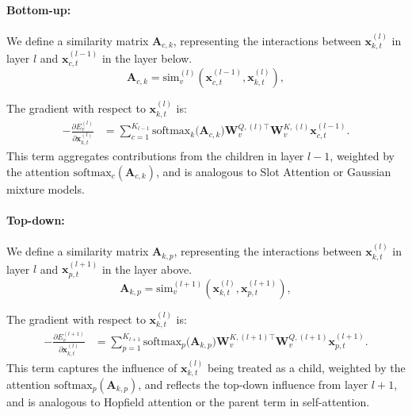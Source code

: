 \documentclass{article}
\begin{document}
\paragraph{Bottom-up:}

We define a similarity matrix \(\bm{A}_{c,k}\), representing the interactions between \(\bm{x}_{k,t}^{(l)}\) in layer \(l\) and \(\bm{x}_{c,t}^{(l-1)}\) in the layer below.
\begin{equation}
\bm{A}_{c,k} = \mathrm{sim}_{v}^{(l)}(\bm{x}_{c,t}^{(l-1)}, \bm{x}_{k,t}^{(l)}),
\end{equation}

The gradient with respect to \(\bm{x}_{k,t}^{(l)}\) is:
\begin{equation}
\begin{aligned}
-\frac{\partial E_{v}^{(l)}}{\partial \bm{x}_{k,t}^{(l)}}
&=
\sum_{c=1}^{K_{l-1}}
\mathrm{softmax}_{k}\bigl(\bm{A}_{c,k}\bigr)
\bm{W}_{v}^{Q,(l)\top} \bm{W}_{v}^{K,(l)} \bm{x}_{c,t}^{(l-1)}.
\end{aligned}
\end{equation}
This term aggregates contributions from the children in layer \(l-1\), weighted by the attention \(\mathrm{softmax}_{c}(\bm{A}_{c,k})\), and is analogous to Slot Attention or Gaussian mixture models.

\paragraph{Top-down:}

We define a similarity matrix \(\bm{A}_{k,p}\), representing the interactions between \(\bm{x}_{k,t}^{(l)}\) in layer \(l\) and \(\bm{x}_{p,t}^{(l+1)}\) in the layer above.
\begin{equation}
\bm{A}_{k,p} = \mathrm{sim}_{v}^{(l+1)}(\bm{x}_{k,t}^{(l)}, \bm{x}_{p,t}^{(l+1)}),
\end{equation}

The gradient with respect to \(\bm{x}_{k,t}^{(l)}\) is:
\begin{equation}
\begin{aligned}
-\frac{\partial E_{v}^{(l+1)}}{\partial \bm{x}_{k,t}^{(l)}}
&=
\sum_{p=1}^{K_{l+1}}
\mathrm{softmax}_{p}\bigl(\bm{A}_{k,p}\bigr)
\bm{W}_{v}^{K,(l+1)\top} \bm{W}_{v}^{Q,(l+1)} \bm{x}_{p,t}^{(l+1)}.
\end{aligned}
\end{equation}
This term captures the influence of \(\bm{x}_{k,t}^{(l)}\) being treated as a child, weighted by the attention \(\mathrm{softmax}_{p}(\bm{A}_{k,p})\), and reflects the top-down influence from layer \(l+1\), and is analogous to Hopfield attention or the parent term in self-attention.
\end{document}
